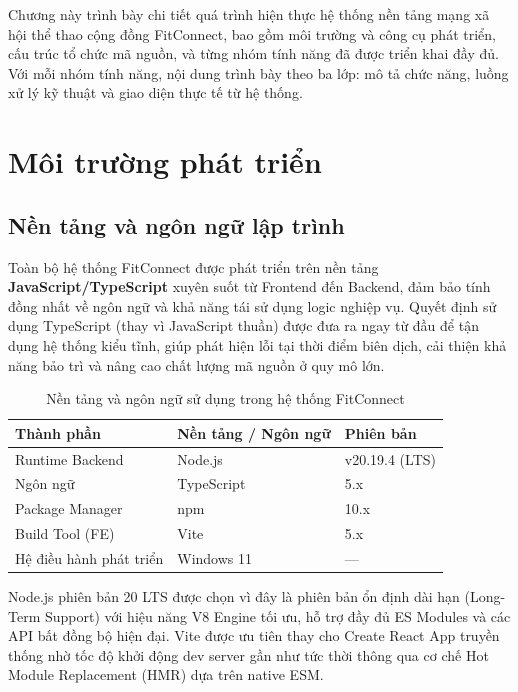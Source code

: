 \label{chap:implementation}

Chương này trình bày chi tiết quá trình hiện thực hệ thống nền tảng mạng xã hội thể thao cộng đồng FitConnect, bao gồm môi trường và công cụ phát triển, cấu trúc tổ chức mã nguồn, và từng nhóm tính năng đã được triển khai đầy đủ. Với mỗi nhóm tính năng, nội dung trình bày theo ba lớp: mô tả chức năng, luồng xử lý kỹ thuật và giao diện thực tế từ hệ thống.

\section{Môi trường phát triển}
\label{sec:impl_dev_environment}

\subsection{Nền tảng và ngôn ngữ lập trình}
\label{subsec:impl_platform}

Toàn bộ hệ thống FitConnect được phát triển trên nền tảng \textbf{JavaScript/TypeScript} xuyên suốt từ Frontend đến Backend, đảm bảo tính đồng nhất về ngôn ngữ và khả năng tái sử dụng logic nghiệp vụ. Quyết định sử dụng TypeScript (thay vì JavaScript thuần) được đưa ra ngay từ đầu để tận dụng hệ thống kiểu tĩnh, giúp phát hiện lỗi tại thời điểm biên dịch, cải thiện khả năng bảo trì và nâng cao chất lượng mã nguồn ở quy mô lớn.

\begin{table}[H]
\centering
\caption{Nền tảng và ngôn ngữ sử dụng trong hệ thống FitConnect}
\label{tab:impl_platform}
\begin{tabular}{|p{4cm}|p{4cm}|p{6cm}|}
\hline
\textbf{Thành phần} & \textbf{Nền tảng / Ngôn ngữ} & \textbf{Phiên bản} \\
\hline
Runtime Backend & Node.js & v20.19.4 (LTS) \\
\hline
Ngôn ngữ & TypeScript & 5.x \\
\hline
Package Manager & npm & 10.x \\
\hline
Build Tool (FE) & Vite & 5.x \\
\hline
Hệ điều hành phát triển & Windows 11 & --- \\
\hline
\end{tabular}
\end{table}

Node.js phiên bản 20 LTS được chọn vì đây là phiên bản ổn định dài hạn (Long-Term Support) với hiệu năng V8 Engine tối ưu, hỗ trợ đầy đủ ES Modules và các API bất đồng bộ hiện đại. Vite được ưu tiên thay cho Create React App truyền thống nhờ tốc độ khởi động dev server gần như tức thời thông qua cơ chế Hot Module Replacement (HMR) dựa trên native ESM.

